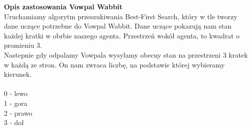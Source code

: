 \documentclass[12pt]{article}
\begin{document}
\noindent \textbf{Opis zastosowania Vowpal Wabbit}\\


Uruchamiamy algorytm przeszukiwania Best-First Search, który w tle tworzy dane uczące potrzebne do Vowpal Wabbit. Dane uczące pokazują nam stan każdej kratki w obrbie naszego agenta. Przestrzeń wokół agenta, to kwadrat o promieniu 3. \\ 

Nastepnie gdy odpalamy Vowpala wysylamy obecny stan na przestrzeni 3 kratek w każdą ze stron. On nam zwraca liczbę, na podstawie której wybieramy kierunek. \\ \\ 
0 - lewo \\
1 - gora \\ 
2 - prawo \\
3 - doł \\
\end{document}
